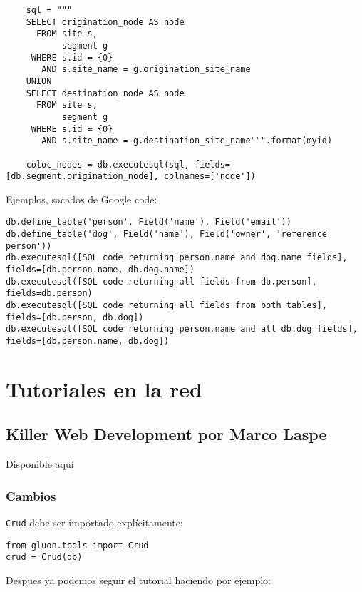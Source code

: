 \documentclass[12pt,spanish,]{article}
\begin{document}
\begin{verbatim}
    sql = """
    SELECT origination_node AS node
      FROM site s,
           segment g
     WHERE s.id = {0}
       AND s.site_name = g.origination_site_name
    UNION
    SELECT destination_node AS node
      FROM site s,
           segment g
     WHERE s.id = {0}
       AND s.site_name = g.destination_site_name""".format(myid)

    coloc_nodes = db.executesql(sql, fields=[db.segment.origination_node], colnames=['node'])
\end{verbatim}

Ejemplos, sacados de Google code:

\begin{verbatim}
db.define_table('person', Field('name'), Field('email'))
db.define_table('dog', Field('name'), Field('owner', 'reference person'))
db.executesql([SQL code returning person.name and dog.name fields], fields=[db.person.name, db.dog.name])
db.executesql([SQL code returning all fields from db.person], fields=db.person)
db.executesql([SQL code returning all fields from both tables], fields=[db.person, db.dog])
db.executesql([SQL code returning person.name and all db.dog fields], fields=[db.person.name, db.dog])
\end{verbatim}

\section{Tutoriales en la red}\label{tutoriales-en-la-red}

\subsection{Killer Web Development por Marco
Laspe}\label{killer-web-development-por-marco-laspe}

Disponible \href{http://killer-web-development.com}{aquí}

\subsubsection{Cambios}\label{cambios}

\texttt{Crud} debe ser importado explícitamente:

\begin{verbatim}
from gluon.tools import Crud
crud = Crud(db)
\end{verbatim}

Despues ya podemos seguir el tutorial haciendo por ejemplo:
\end{document}
